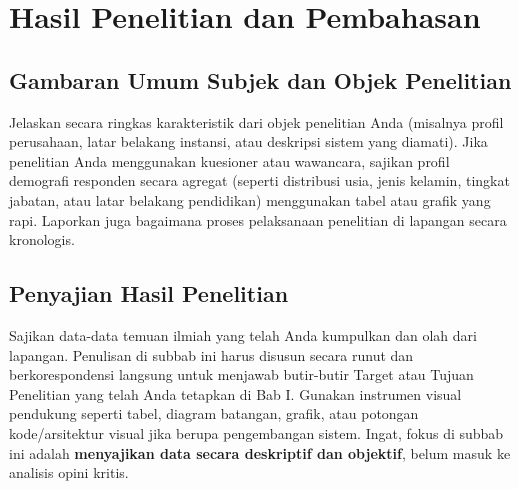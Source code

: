 \chapter{Hasil Penelitian dan Pembahasan}



\section{Gambaran Umum Subjek dan Objek Penelitian}

Jelaskan secara ringkas karakteristik dari objek penelitian Anda (misalnya profil perusahaan, latar belakang instansi, atau deskripsi sistem yang diamati). Jika penelitian Anda menggunakan kuesioner atau wawancara, sajikan profil demografi responden secara agregat (seperti distribusi usia, jenis kelamin, tingkat jabatan, atau latar belakang pendidikan) menggunakan tabel atau grafik yang rapi. Laporkan juga bagaimana proses pelaksanaan penelitian di lapangan secara kronologis.



\section{Penyajian Hasil Penelitian}

Sajikan data-data temuan ilmiah yang telah Anda kumpulkan dan olah dari lapangan. Penulisan di subbab ini harus disusun secara runut dan berkorespondensi langsung untuk menjawab butir-butir Target atau Tujuan Penelitian yang telah Anda tetapkan di Bab I. Gunakan instrumen visual pendukung seperti tabel, diagram batangan, grafik, atau potongan kode/arsitektur visual jika berupa pengembangan sistem. Ingat, fokus di subbab ini adalah \textbf{menyajikan data secara deskriptif dan objektif}, belum masuk ke analisis opini kritis.



